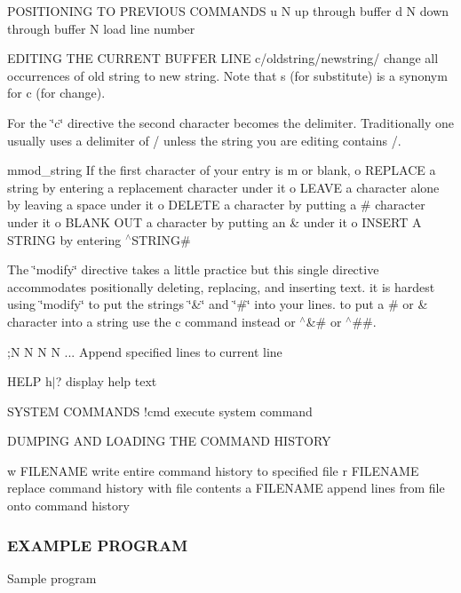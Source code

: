 P\+O\+S\+I\+T\+I\+O\+N\+I\+NG TO P\+R\+E\+V\+I\+O\+US C\+O\+M\+M\+A\+N\+DS u N up through buffer d N down through buffer N load line number

E\+D\+I\+T\+I\+NG T\+HE C\+U\+R\+R\+E\+NT B\+U\+F\+F\+ER L\+I\+NE c/oldstring/newstring/ change all occurrences of old string to new string. Note that s (for substitute) is a synonym for c (for change).

For the \char`\"{}c\char`\"{} directive the second character becomes the delimiter. Traditionally one usually uses a delimiter of / unless the string you are editing contains /.

mmod\+\_\+string If the first character of your entry is m or blank, o R\+E\+P\+L\+A\+CE a string by entering a replacement character under it o L\+E\+A\+VE a character alone by leaving a space under it o D\+E\+L\+E\+TE a character by putting a \# character under it o B\+L\+A\+NK O\+UT a character by putting an \& under it o I\+N\+S\+E\+RT A S\+T\+R\+I\+NG by entering $^\wedge$\+S\+T\+R\+I\+NG\#

The \char`\"{}modify\char`\"{} directive takes a little practice but this single directive accommodates positionally deleting, replacing, and inserting text. it is hardest using \char`\"{}modify\char`\"{} to put the strings \char`\"{}\&\char`\"{} and \char`\"{}\#\char`\"{} into your lines. to put a \# or \& character into a string use the \textquotesingle{}c\textquotesingle{} command instead or $^\wedge$\&\# or $^\wedge$\#\#.

;N N N N ... Append specified lines to current line

H\+E\+LP h$\vert$? display help text

S\+Y\+S\+T\+EM C\+O\+M\+M\+A\+N\+DS !cmd execute system command

D\+U\+M\+P\+I\+NG A\+ND L\+O\+A\+D\+I\+NG T\+HE C\+O\+M\+M\+A\+ND H\+I\+S\+T\+O\+RY \begin{DoxyVerb}  w FILENAME   write entire command history to specified file
  r FILENAME   replace command history with file contents
  a FILENAME   append lines from file onto command history
\end{DoxyVerb}


\subsubsection*{E\+X\+A\+M\+P\+LE P\+R\+O\+G\+R\+AM}

Sample program

